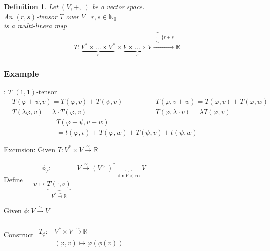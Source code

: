 \documentclass[10pt, twoside]{amsart}
\newtheorem{definition}{Definition}
\begin{document}
\begin{multicols*}{2}
\begin{definition}
  Let $(V,+,\cdot)$ be a vector space. \\
An \underline{ $(r,s)$-tensor $T$ over $V$ } \qquad \, $r,s \in \mathbb{N}_0 $\\
is a multi-linera map
\[
T: \underbrace{ V^* \times \dots \times V^* }_r \times \underbrace{ V \times \dots \times V}_s \xrightarrow{ \substack{ \sim \\ \vdots \\ \sim } \rbrace r + s } \mathbb{R}
\]
\end{definition}

\subsubsection{Example}: $T$ $(1,1)$-tensor
\[
\begin{aligned}
  & T(\varphi + \psi, v) = T(\varphi,v) + T(\psi,v) \\ 
  & T(\lambda \varphi , v) = \lambda \cdot T(\varphi,v)
\end{aligned} \qquad \qquad \begin{gathered}
T(\varphi,v+w) = T(\varphi,v) + T(\varphi,w) \\ 
T(\varphi, \lambda \cdot v) = \lambda T(\varphi, v) 
\end{gathered}
\]
\[
\begin{gathered}
  T(\varphi + \psi , v+ w)  = \\
  = t(\varphi,v) + T(\varphi,w) + T(\psi,v) + t(\psi,w)
\end{gathered}
\]

\underline{Excursion}:
Given $T:V^* \times V \xrightarrow{ \sim } \mathbb{R}$

Define $\begin{aligned} & \quad \ 
   \phi_T: & V\xrightarrow{ \sim } (V*)^* \underbrace{=}_{\text{dim}V < \infty} V \\
  & v\mapsto \underbrace{ T(\cdot , v)  }_{V^* \xrightarrow{ \sim } \mathbb{R}} \end{aligned}$

Given $\phi : V \xrightarrow{ \sim } V$

Construct $\begin{aligned} & \quad \\ 
   T_{\phi} : & V^* \times V \xrightarrow{ \sim } \mathbb{R} \\
   & (\varphi,v) \mapsto \varphi(\phi(v)) \end{aligned}$


\end{multicols*}
\end{document}
